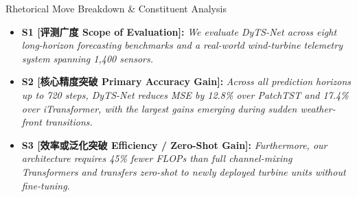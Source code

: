 \begin{TipBox}{Rhetorical Move Breakdown \& Constituent Analysis}
\begin{itemize}[leftmargin=1.5em]
  \item \textbf{S1 [评测广度 Scope of Evaluation]:} \textit{We evaluate DyTS-Net across eight long-horizon forecasting benchmarks and a real-world wind-turbine telemetry system spanning 1,400 sensors.}\par{}
  \item \textbf{S2 [核心精度突破 Primary Accuracy Gain]:} \textit{Across all prediction horizons up to 720 steps, DyTS-Net reduces MSE by 12.8\% over PatchTST and 17.4\% over iTransformer, with the largest gains emerging during sudden weather-front transitions.}\par{}
  \item \textbf{S3 [效率或泛化突破 Efficiency / Zero-Shot Gain]:} \textit{Furthermore, our architecture requires 45\% fewer FLOPs than full channel-mixing Transformers and transfers zero-shot to newly deployed turbine units without fine-tuning.}\par{}
\end{itemize}
\end{TipBox}
\medskip
